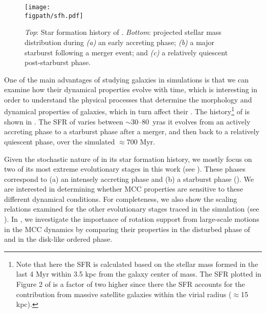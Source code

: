 \IfFileExists{emulateapjlegacy.cls}{\documentclass[iop]{emulateapjlegacy}}{\documentclass[iop]{emulateapj}}
\def\figpath{./Fig}
\begin{document}
\begin{figure*}
\centering
\texttt{[image: \\figpath/sfh.pdf]}
\caption{
    {\it Top}: Star formation history of \flower. {\it Bottom}:
    projected stellar mass distribution during {\it (a)} an early
    accreting phase;  {\it (b)} a major starburst following a merger
    event; and {\it (c)} a relatively quiescent post-starburst
    phase. 
\label{fig:SFH}}
\end{figure*}

One of the main advantages of studying galaxies in simulations is that we can examine how their dynamical properties evolve with time, which
is interesting in order to understand the physical processes that determine the morphology and dynamical properties of galaxies, which in turn affect their \SF.
%
The \SF history\footnote{Note that here the SFR is calculated based on
  the stellar mass formed in the last 4 Myr within 3.5 kpc from the
  galaxy center of mass. The SFR plotted in Figure 2 of
  \citet{Pallottini17b} is a factor of two higher since there the SFR
  accounts for the contribution from massive satellite galaxies within
  the virial radius ($\approx$15\,kpc).} of \flower is shown in
. The SFR of \flower varies between $\sim$30--80 \Msun\,yr\pmOne as it evolves from an actively accreting phase to a starburst phase after a merger, and then back to a relatively quiescent phase, over the simulated $\approx 700$ Myr.

Given the stochastic nature of \flower in its star formation history, we mostly focus on
two of its most extreme evolutionary stages in this work (see ).
These phases correspond to (a) an intensely accreting phase and
(b) a starburst phase (). We are interested in determining whether 
MCC properties are sensitive to these different dynamical
conditions. For completeness, we also show the scaling relations examined for the other evolutionary stages 
traced in the simulation (see ). 
In , we investigate the importance of rotation support from large-scale motions in the MCC dynamics by comparing their properties 
in the disturbed phase of \flower and in the disk-like ordered phase. 
\end{document}
